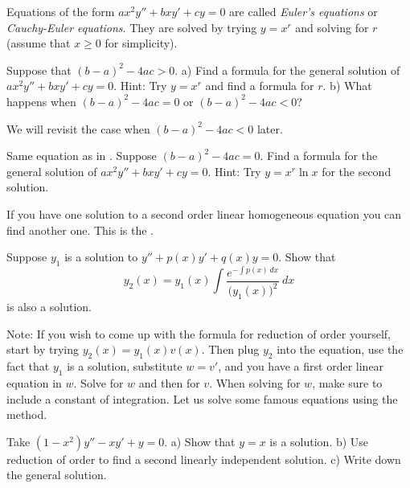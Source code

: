 \documentclass[12pt]{book}
\begin{document}
Equations of the form $a x^2 y'' + b x y' + c y = 0$ are called
\emph{Euler's equations} or
\emph{Cauchy-Euler equations}.
They are solved by trying
$y=x^r$ and solving for $r$ (assume that $x \geq 0$ for simplicity).

\begin{exercise} \label{sol:eulerex}
Suppose that ${(b-a)}^2-4ac > 0$.  a) Find a formula for the general solution
of $a x^2 y'' + b x y' + c y = 0$.  Hint: Try $y=x^r$ and find a formula for
$r$.
b) What happens when ${(b-a)}^2-4ac = 0$ or ${(b-a)}^2-4ac < 0$?
\end{exercise}

We will revisit the case when ${(b-a)}^2-4ac < 0$ later.

\begin{exercise} \label{sol:eulerexln}
Same equation as in .
Suppose ${(b-a)}^2-4ac = 0$.  Find a formula for the general solution
of $a x^2 y'' + b x y' + c y = 0$.  Hint: Try $y=x^r \ln x$ for the second
solution.
\end{exercise}

If you have one solution to a second order linear homogeneous
equation you can find another one.  This is the \emph{}.

\begin{exercise} \label{exercise:reductionoforder}
Suppose $y_1$ is a solution to $y'' + p(x) y' + q(x) y = 0$.
Show that
\begin{equation*}
y_2(x) = y_1(x) \int \frac{e^{-\int p(x)\,dx}}{{\bigl(y_1(x)\bigr)}^2} ~dx
\end{equation*}
is also a solution.
\end{exercise}

Note: If you wish to come up with the formula for reduction of order
yourself,
start by trying $y_2(x) = y_1(x) v(x)$.  Then plug $y_2$ into the
equation, use the fact that $y_1$ is a solution, substitute
$w = v'$, and you have a first order linear equation in $w$.  Solve for
$w$ and then for $v$.  When solving for $w$, make sure to include a constant
of integration.
Let us solve some famous equations using the method.

\begin{exercise}
Take 
$(1-x^2)y''-xy' + y = 0$.  a) Show that $y=x$ is a solution.
b) Use reduction of order to find a second linearly independent solution.
c) Write down the general solution.
\end{exercise}
\end{document}
